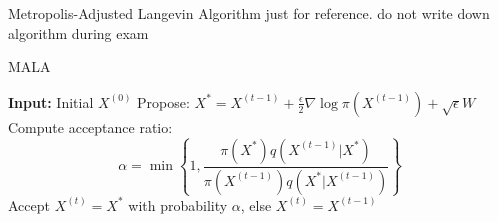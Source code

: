 \begin{frame}{Metropolis-Adjusted Langevin Algorithm \tiny just for reference. do not write down algorithm during exam}
	\begin{algorithm}[H]
		\caption{MALA}
		\begin{algorithmic}
			\STATE \textbf{Input:} Initial $X^{(0)}$
			\STATE Propose: $X^* = X^{(t-1)} + \frac{\epsilon}{2}\nabla\log\pi(X^{(t-1)}) + \sqrt{\epsilon}W$
			\STATE Compute acceptance ratio:
			$$\alpha = \min\left\{1, \frac{\pi(X^*)q(X^{(t-1)}|X^*)}{\pi(X^{(t-1)})q(X^*|X^{(t-1)})}\right\}$$
			\STATE Accept $X^{(t)} = X^*$ with probability $\alpha$, else $X^{(t)} = X^{(t-1)}$
			\ENDFOR
		\end{algorithmic}
	\end{algorithm}
\end{frame}

